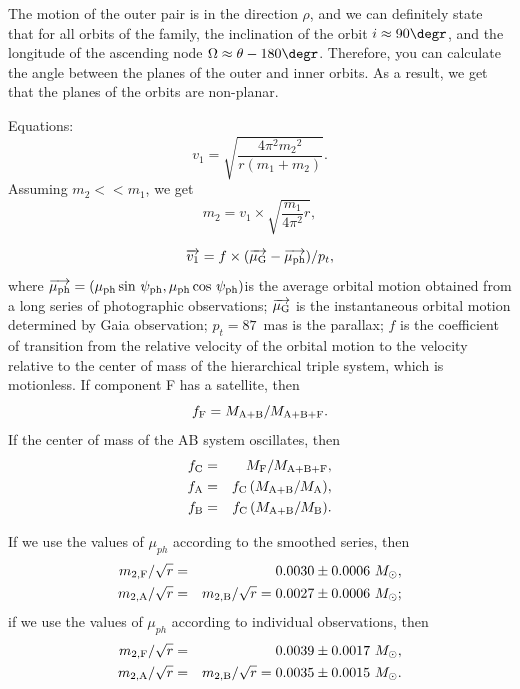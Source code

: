 \documentclass[
 aps, pra,
 amsmath,amssymb,
 11pt,
 final,
tightenlines,
 twoside,
 twocolumn,
 nofloats,
nofootinbib,
 superscriptaddress,
showkeys,
showkeywords,
 ]
{revtex4-2}
\begin{document}
The motion of the outer pair is in the direction $\rho$, and we can
definitely state that for all orbits of the family,
the inclination of the orbit $i\approx90\degr$,
and the longitude of the ascending node $\Omega\approx\theta-180\degr$.
Therefore, you can calculate the angle between the planes of
the outer and inner orbits. As a result, we get that the planes
of the orbits are non-planar. 


Equations:
\begin{equation}
\label{one} 
v_1=\sqrt{\dfrac{4\pi^2{m_2}^2}{r(m_1+m_2)}}.\nonumber
\end{equation}
Assuming $m_2<<m_1$, we get
\begin{equation}
\label{two} 
m_2=v_1 \times\sqrt{\dfrac{m_1}{4\pi^2}r},\nonumber
\end{equation}

\begin{equation}
\label{three}
\overrightarrow{v_1}=f\times(\overrightarrow{\mu_{\rm
G}}-\overrightarrow{\mu_{\rm ph}})/p_t,\nonumber
\end{equation}
where $\overrightarrow{\mu_{\rm ph}}=(\mu_{\rm ph} \sin\,\psi_{\rm
ph},\mu_{\rm ph} \cos\,\psi_{\rm ph})$is the average orbital motion
obtained from a long series of photographic observations;
$\overrightarrow{\mu_{\rm G}}$ is the instantaneous orbital motion
determined by Gaia observation; \mbox{$p_t=87$}~mas is the parallax; $f$ is the coefficient of transition
from the relative velocity of the orbital motion to the velocity
relative to the center of mass of the hierarchical triple system,
which is motionless. If component F has a satellite,
then $$f_{\rm F}=M_{\rm A+B}/M_{\rm A+B+F}.$$ If the center of mass
of the AB system oscillates, then
\begin{eqnarray}
 f_{\rm C}&=&M_{\rm F}/M_{\rm A+B+F},\nonumber\\
 f_{\rm A}&=&f_{\rm C}\,(M_{\rm A+B}/M_{\rm A}),\nonumber\\
 f_{\rm B}&=&f_{\rm C}\,(M_{\rm A+B}/M_{\rm B}).\nonumber
\end{eqnarray}

If we use the values of $\mu_{ph}$ according to the smoothed series,
then
\begin{eqnarray}
 m_{2,{\rm F}}/\sqrt{r}&=&0.0030\pm0.0006~M_\odot,\nonumber\\
 m_{2,{\rm A}}/\sqrt{r}&=&m_{2,{\rm B}}/\sqrt{r}=0.0027\pm0.0006~M_\odot;\nonumber
\end{eqnarray}
if we use the values of $\mu_{ph}$ according to individual observations, then
\begin{eqnarray}
 m_{2,{\rm F}}/\sqrt{r}&=&0.0039\pm0.0017~M_\odot,\nonumber\\
 m_{2,{\rm A}}/\sqrt{r}&=&m_{2,{\rm B}}/\sqrt{r}=0.0035\pm0.0015~M_\odot.\nonumber
\end{eqnarray}
\end{document}
